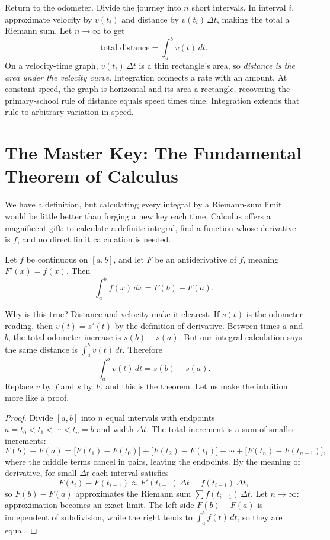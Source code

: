 Return to the odometer. Divide the journey into $n$ short intervals. In interval $i$, approximate velocity by $v(t_i)$ and distance by $v(t_i)\,\Delta t$, making the total a Riemann sum. Let $n\to\infty$ to get
\[
\text{total distance}=\int_a^b v(t)\,dt .
\]
On a velocity-time graph, $v(t_i)\,\Delta t$ is a thin rectangle's area, so \emph{distance is the area under the velocity curve}. Integration connects a rate with an amount. At constant speed, the graph is horizontal and its area a rectangle, recovering the primary-school rule of distance equals speed times time. Integration extends that rule to arbitrary variation in speed.

\section{The Master Key: The Fundamental Theorem of Calculus}

We have a definition, but calculating every integral by a Riemann-sum limit would be little better than forging a new key each time. Calculus offers a magnificent gift: to calculate a definite integral, find a function whose derivative is $f$, and no direct limit calculation is needed.

\begin{dingli}
Let $f$ be continuous on $[a,b]$, and let $F$ be an antiderivative of $f$, meaning $F'(x)=f(x)$. Then
\[
\int_a^b f(x)\,dx=F(b)-F(a).
\]
\end{dingli}

Why is this true? Distance and velocity make it clearest. If $s(t)$ is the odometer reading, then $v(t)=s'(t)$ by the definition of derivative. Between times $a$ and $b$, the total odometer increase is $s(b)-s(a)$. But our integral calculation says the same distance is $\int_a^b v(t)\,dt$. Therefore
\[
\int_a^b v(t)\,dt=s(b)-s(a).
\]
Replace $v$ by $f$ and $s$ by $F$, and this is the theorem. Let us make the intuition more like a proof.

\begin{proof}
Divide $[a,b]$ into $n$ equal intervals with endpoints $a=t_0<t_1<\cdots<t_n=b$ and width $\Delta t$. The total increment is a sum of smaller increments:
\[
F(b)-F(a)=\bigl[F(t_1)-F(t_0)\bigr]+\bigl[F(t_2)-F(t_1)\bigr]+\cdots+\bigl[F(t_n)-F(t_{n-1})\bigr],
\]
where the middle terms cancel in pairs, leaving the endpoints. By the meaning of derivative, for small $\Delta t$ each interval satisfies
\[
F(t_i)-F(t_{i-1})\approx F'(t_{i-1})\,\Delta t=f(t_{i-1})\,\Delta t ,
\]
so $F(b)-F(a)$ approximates the Riemann sum $\sum f(t_{i-1})\,\Delta t$. Let $n\to\infty$: approximation becomes an exact limit. The left side $F(b)-F(a)$ is independent of subdivision, while the right tends to $\int_a^b f(t)\,dt$, so they are equal.
\end{proof}

